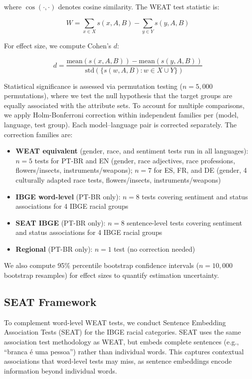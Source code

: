 \documentclass{sbc2019}
\begin{document}
where $\cos(\cdot, \cdot)$ denotes cosine similarity. The WEAT test statistic is:

\begin{equation}
    W = \sum_{x \in X} s(x, A, B) - \sum_{y \in Y} s(y, A, B)
\end{equation}

For effect size, we compute Cohen's $d$:

\begin{equation}
    d = \frac{\text{mean}(s(x, A, B)) - \text{mean}(s(y, A, B))}{\text{std}(\{s(w, A, B) : w \in X \cup Y\})}
\end{equation}

Statistical significance is assessed via permutation testing ($n = 5{,}000$ permutations), where we test the null hypothesis that the target groups are equally associated with the attribute sets. To account for multiple comparisons, we apply Holm-Bonferroni correction within independent families per (model, language, test group). Each model--language pair is corrected separately. The correction families are:

\begin{itemize}[nosep]
    \item \textbf{WEAT equivalent} (gender, race, and sentiment tests run in all languages): $n = 5$ tests for PT-BR and EN (gender, race adjectives, race professions, flowers/insects, instruments/weapons); $n = 7$ for ES, FR, and DE (gender, 4 culturally adapted race tests, flowers/insects, instruments/weapons)
    \item \textbf{IBGE word-level} (PT-BR only): $n = 8$ tests covering sentiment and status associations for 4 IBGE racial groups
    \item \textbf{SEAT IBGE} (PT-BR only): $n = 8$ sentence-level tests covering sentiment and status associations for 4 IBGE racial groups
    \item \textbf{Regional} (PT-BR only): $n = 1$ test (no correction needed)
\end{itemize}

We also compute 95\% percentile bootstrap confidence intervals ($n = 10{,}000$ bootstrap resamples) for effect sizes to quantify estimation uncertainty.

\subsection{SEAT Framework}

To complement word-level WEAT tests, we conduct Sentence Embedding Association Tests (SEAT) for the IBGE racial categories. SEAT uses the same association test methodology as WEAT, but embeds complete sentences (e.g., ``branca \'e uma pessoa'') rather than individual words. This captures contextual associations that word-level tests may miss, as sentence embeddings encode information beyond individual words.
\end{document}
